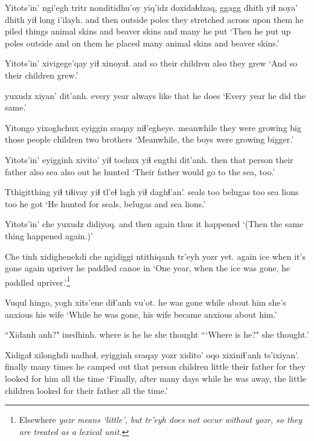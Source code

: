 \documentclass[12pt]{article}
\begin{document}
\gll Yitots'in' ngi'egh tritr nonditidhu'oy yiq'idz doxidaɬdzaq, ggagg  dhith yiɬ noya' dhith yiɬ long i'ilayh.
{and then} outside  poles {they stretched across} {upon them} {he piled things} animal  skins and beaver skins and many {he put}
\glt `Then he put up poles outside and on them he placed many animal skins and beaver skins.'
\glend 

\gll Yitots'in' xivigege'qay yiɬ xinoyaɬ.
{and so} {their children} also {they grew}
\glt `And so their children grew.'
\glend 

 {yuxudz xiyan'} dit'anh.
{every year}  {always like that} {he does}
\glt `Every year he did the same.'
\glend 

\gll Yitongo yixoghchux   eyiggin sraqay niɬ'egheye.
meanwhile {they were growing big} {those people} children {two brothers}
\glt `Meanwhile, the boys were growing bigger.'
\glend 

\gll Yitots'in' eyigginh xivito'  yiɬ tochux  yiɬ engthi  dit'anh.
then  {that person} {their father} also sea  also out {he hunted}
\glt `Their father would go to the sea, too.'
\glend 

\gll Tthigitthing yiɬ tiɬivay yiɬ {tl'eɬ lagh} yiɬ daghɬ'an'.
seals  too belugas too {sea lions} too {he got}
\glt `He hunted for seals, belugas and sea lions.'
\glend 

\gll Yitots'in' che yuxudz didiyoq.
{and then} again thus  {it happened} 
\glt  `(Then the same thing happened again.)'
\glend 

\gll Che tinh xidighenekdi che ngidiggi ntithiqanh {tr'eyh yozr} yet.
again ice {when it's gone} again upriver {he paddled} canoe  in
\glt  `One year, when the ice was gone, he paddled upriver.'\footnote{Elsewhere \em yozr \em means `little', but \em tr'eyh \em does not occur without \em yozr, so they are treated as a lexical unit.}
\glend

\gll Vuqul  hingo, yogh {xits'ene diɬ'anh} vu'ot.
{he was gone} while {about him} {she's anxious} {his wife}
\glt `While he was gone, his wife became anxious about him.'
\glend 

\gll ``Xidanh anh?" inedhinh.
{where is he} he  {she thought}
\glt ```Where is he?" she thought.'
\glend 

\gll Xidigaɬ xilonghdi nadhoɬ, eyigginh sraqay  yozr xidito'  oqo xixiniɬ'anh ts'ixiyan'.
finally  {many times} {he camped out} {that person} children little {their father} for {they looked for him} {all the time}
\glt `Finally, after many days while he was away, the little children looked for their father all the time.'
\glend 
\end{document}
